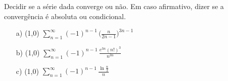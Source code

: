 \documentclass[12pt,a4paper]{article}
\begin{document}
\newpage

 Decidir se a série dada converge ou não. Em caso afirmativo, dizer se a convergência é absoluta ou condicional.

\begin{itemize}
\item[a)] (1,0) $\displaystyle\sum_{n=1}^\infty (-1)^{n-1} \, \Big( \frac{n}{2n-1} \Big)^{3n-1}$
\item[b)] (1,0) $\displaystyle\sum_{n=1}^\infty (-1)^{n-1} \, \frac{e^{3n} (n!)^3}{n^{3n}}$
\item[c)] (1,0) $\displaystyle\sum_{n=1}^\infty (-1)^{n-1} \, \frac{\ln \frac{n}{2}}{n}$
\end{itemize}

 \\
\end{document}
